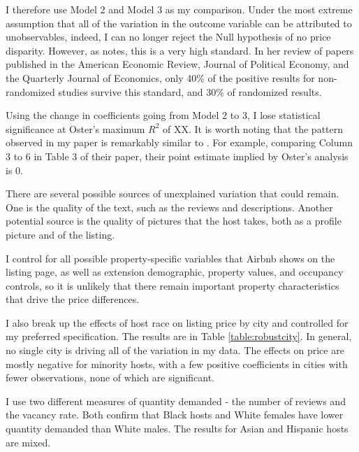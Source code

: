 
I therefore use Model 2 and Model 3 as my comparison. Under the most extreme assumption that all of the variation in the outcome variable can be attributed to unobservables, indeed, I can no longer reject the Null hypothesis of no price disparity. However, as \cite{oster} notes, this is a very high standard. In her review of papers published in the American Economic Review, Journal of Political Economy, and the Quarterly Journal of Economics, only 40\% of the positive results for non-randomized studies survive this standard, and 30\% of randomized results. 

Using the change in coefficients going from Model 2 to 3, I lose statistical significance at Oster’s maximum $R^2$ of XX. It is worth noting that the pattern observed in my paper is remarkably similar to \cite{kakar}. For example, comparing Column 3 to 6 in Table 3 of their paper, their point estimate implied by Oster's analysis is 0. 






There are several possible sources of unexplained variation that could remain. One is the quality of the text, such as the reviews and descriptions. Another potential source is the quality of pictures that the host takes, both as a profile picture and of the listing. 

I control for all possible property-specific variables that Airbnb shows on the listing page, as well as extension demographic, property values, and occupancy controls, so it is unlikely that there remain important property characteristics that drive the price differences. 











I also break up the effects of host race on listing price by city and controlled for my preferred specification. The results are in Table \ref{table:robustcity}. In general, no single city is driving all of the variation in my data. The effects on price are mostly negative for minority hosts, with a few positive coefficients in cities with fewer observations, none of which are significant. 

I use two different measures of quantity demanded - the number of reviews and the vacancy rate. Both confirm that Black hosts and White females have lower quantity demanded than White males. The results for Asian and Hispanic hosts are mixed. 

